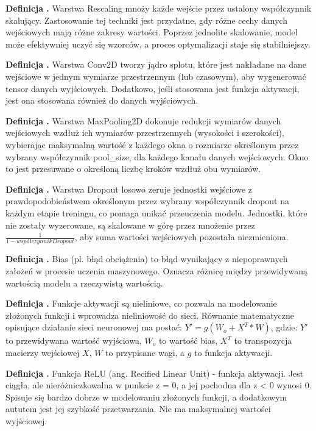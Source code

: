 \noindent
\textbf{Definicja \mlDefinitionIndex.}
\incrementMlDefinitionIndex
Warstwa Rescaling mnoży każde wejście przez ustalony współczynnik skalujący.
Zastosowanie tej techniki jest przydatne, gdy różne cechy danych wejściowych mają różne zakresy wartości.
Poprzez jednolite skalowanie, model może efektywniej uczyć się wzorców, a proces optymalizacji staje się stabilniejszy.

\noindent
\textbf{Definicja \mlDefinitionIndex.}
\incrementMlDefinitionIndex
Warstwa Conv2D tworzy jądro splotu, które jest nakładane na dane wejściowe w jednym wymiarze przestrzennym (lub czasowym), 
aby wygenerować tensor danych wyjściowych.
Dodatkowo, jeśli stosowana jest funkcja aktywacji, jest ona stosowana również do danych wyjściowych.

\noindent
\textbf{Definicja \mlDefinitionIndex.}
\incrementMlDefinitionIndex
Warstwa MaxPooling2D dokonuje redukcji wymiarów danych wejściowych wzdłuż ich wymiarów przestrzennych (wysokości i szerokości),
wybierając maksymalną wartość z każdego okna o rozmiarze określonym przez wybrany współczynnik pool\_size,
dla każdego kanału danych wejściowych.
Okno to jest przesuwane o określoną liczbę kroków wzdłuż obu wymiarów.

\noindent
\textbf{Definicja \mlDefinitionIndex.}
\incrementMlDefinitionIndex
Warstwa Dropout losowo zeruje jednostki wejściowe z prawdopodobieństwem określonym
przez wybrany współczynnik dropout na każdym etapie treningu, co pomaga unikać przeuczenia modelu.
Jednostki, które nie zostały wyzerowane, są skalowane w górę przez mnożenie przez $\frac{1}{1 - współczynnikDropout}$,
aby suma wartości wejściowych pozostała niezmieniona.

\noindent
\textbf{Definicja \mlDefinitionIndex.}
\incrementMlDefinitionIndex
Bias (pl. błąd obciążenia) to błąd wynikający z niepoprawnych założeń w procesie uczenia maszynowego.
Oznacza różnicę między przewidywaną wartością modelu a rzeczywistą wartością.

\noindent
\textbf{Definicja \mlDefinitionIndex.}
\incrementMlDefinitionIndex
Funkcje aktywacji są nieliniowe, co pozwala na modelowanie złożonych funkcji i wprowadza nieliniowość do sieci.
Równanie matematyczne opisujące działanie sieci neuronowej ma postać: $Y' = g(W_o + X^T * W)$, gdzie:
$Y'$ to przewidywana wartość wyjściowa,
$W_o$ to wartość bias,
$X^T$ to transpozycja macierzy wejściowej $X$,
$W$ to przypisane wagi,
a $g$ to funkcja aktywacji.

\noindent
\textbf{Definicja \mlDefinitionIndex.}
\incrementMlDefinitionIndex
Funkcja ReLU (ang. Recified Linear Unit) - funkcja aktywacji.
Jest ciągła, ale nieróżniczkowalna w punkcie z = 0, a jej pochodna dla z < 0 wynosi 0.
Spisuje się bardzo dobrze w modelowaniu złożonych funkcji, a dodatkowym aututem jest jej szybkość przetwarzania.
Nie ma maksymalnej wartości wyjściowej.


